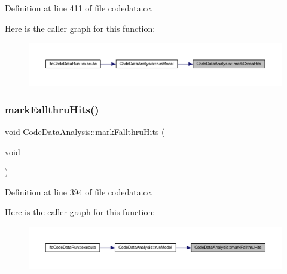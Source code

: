 Definition at line 411 of file codedata.\+cc.

Here is the caller graph for this function\+:
\nopagebreak
\begin{figure}[H]
\begin{center}
\leavevmode
\includegraphics[width=350pt]{class_code_data_analysis_a1ac3f1a95c3c0ad7a59e15d1027f9909_icgraph}
\end{center}
\end{figure}
\mbox{\label{class_code_data_analysis_acfa3dd51339107e25b206a6b7f5fd3ab}} 
\subsubsection{\texorpdfstring{markFallthruHits()}{markFallthruHits()}}
{\footnotesize\ttfamily void Code\+Data\+Analysis\+::mark\+Fallthru\+Hits (\begin{DoxyParamCaption}\item[{void}]{ }\end{DoxyParamCaption})}



Definition at line 394 of file codedata.\+cc.

Here is the caller graph for this function\+:
\nopagebreak
\begin{figure}[H]
\begin{center}
\leavevmode
\includegraphics[width=350pt]{class_code_data_analysis_acfa3dd51339107e25b206a6b7f5fd3ab_icgraph}
\end{center}
\end{figure}
\mbox{\label{class_code_data_analysis_af81c1c8ff3416ae4487a9d81eb0c1df3}} 
